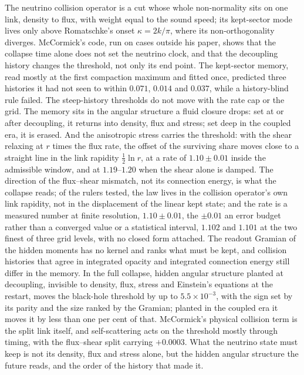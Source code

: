 \documentclass[11pt]{article}
\begin{document}
The neutrino collision operator is a cut whose whole non-normality sits on one link, density to flux, with weight equal to the sound speed; its kept-sector mode lives only above Romatschke's onset $\kappa=2k/\pi$, where its non-orthogonality diverges. McCormick's code, run on cases outside his paper, shows that the collapse time alone does not set the neutrino clock, and that the decoupling history changes the threshold, not only its end point. The kept-sector memory, read mostly at the first compaction maximum and fitted once, predicted three histories it had not seen to within $0.071$, $0.014$ and $0.037$, while a history-blind rule failed. The steep-history thresholds do not move with the rate cap or the grid. The memory sits in the angular structure a fluid closure drops: set at or after decoupling, it returns into density, flux and stress; set deep in the coupled era, it is erased. And the anisotropic stress carries the threshold: with the shear relaxing at $r$ times the flux rate, the offset of the surviving share moves close to a straight line in the link rapidity $\tfrac12\ln r$, at a rate of $1.10\pm0.01$ inside the admissible window, and at $1.19$--$1.20$ when the shear alone is damped. The direction of the flux--shear mismatch, not its connection energy, is what the collapse reads; of the rulers tested, the law lives in the collision operator's own link rapidity, not in the displacement of the linear kept state; and the rate is a measured number at finite resolution, $1.10\pm0.01$, the $\pm0.01$ an error budget rather than a converged value or a statistical interval, $1.102$ and $1.101$ at the two finest of three grid levels, with no closed form attached. The readout Gramian of the hidden moments has no kernel and ranks what must be kept, and collision histories that agree in integrated opacity and integrated connection energy still differ in the memory. In the full collapse, hidden angular structure planted at decoupling, invisible to density, flux, stress and Einstein's equations at the restart, moves the black-hole threshold by up to $5.5\times10^{-3}$, with the sign set by its parity and the size ranked by the Gramian; planted in the coupled era it moves it by less than one per cent of that. McCormick's physical collision term is the split link itself, and self-scattering acts on the threshold mostly through timing, with the flux--shear split carrying $+0.0003$. What the neutrino state must keep is not its density, flux and stress alone, but the hidden angular structure the future reads, and the order of the history that made it.
\end{document}
